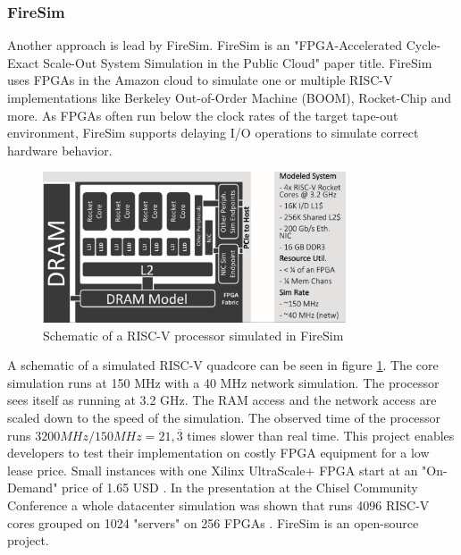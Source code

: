 \subsubsection{FireSim}
Another approach is lead by FireSim.
FireSim is an "FPGA-Accelerated Cycle-Exact Scale-Out
System Simulation in the Public Cloud"
\cite{firesim_fpga_accelerated} paper title.
FireSim uses FPGAs in the Amazon cloud to
simulate one or multiple RISC-V implementations
like Berkeley Out-of-Order Machine (BOOM), Rocket-Chip
and more.
As FPGAs often run below the clock rates of the target
tape-out environment, FireSim supports delaying I/O
operations to simulate correct hardware behavior.
\begin{figure}
    \centering
    \includegraphics[width=0.8\textwidth]{figures/firesim_riscv_on_fpga}
    \caption{Schematic of a RISC-V processor simulated in FireSim
        \cite[min.~9:00]{chisel_community_firesim}}
    \label{fig:firesim_riscv_on_fpga}
\end{figure}
A schematic of a simulated RISC-V quadcore can be
seen in figure \ref{fig:firesim_riscv_on_fpga}.
The core simulation runs at 150 MHz with a 40 MHz
network simulation. The processor sees itself as running
at 3.2 GHz. The RAM access and the
network access are scaled down to the speed of the
simulation. The observed time of the processor
runs $3200 MHz/150 MHz = 21,\overline{3}$ times slower
than real time.
This project enables developers to test their
implementation on costly FPGA equipment for
a low lease price. Small instances with one 
Xilinx UltraScale+ FPGA \cite{xilinx_amazon_ultrascale}
start at an "On-Demand" price of 1.65 USD
\cite{amazon_fpga_instances}.
In the presentation at the Chisel Community Conference
a whole datacenter simulation was shown that runs 4096
RISC-V cores grouped on 1024 "servers" on 256 FPGAs
\cite[min.~12:08]{chisel_community_firesim}.
FireSim is an open-source project.

